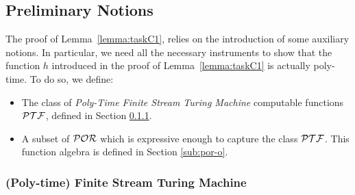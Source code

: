 \subsection{Preliminary Notions}\label{sec:preliminary}
The proof of Lemma~\ref{lemma:taskC1},
relies on the introduction of some auxiliary notions.
In particular, we need all the necessary instruments to
show that the function $h$ introduced in the
proof of Lemma~\ref{lemma:taskC1} is actually poly-time.
%
To do so, we define:

\begin{itemize}
\item The class of \emph{Poly-Time Finite Stream Turing Machine} computable functions $\mathcal{PTF}$, defined in Section \ref{sec:poly-timeTM}.
\item A subset of $\mathcal{POR}$ which is expressive enough to capture the class $\mathcal{PTF}$.
This function algebra is defined in Section \ref{sub:por-o}.
\end{itemize}
%









\subsubsection{(Poly-time) Finite Stream Turing Machine}\label{sec:poly-timeTM}


